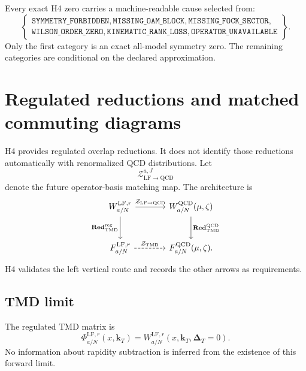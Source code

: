\documentclass[11pt]{article}
\newcommand{\kT}{\bm{k}_{T}}
\newcommand{\DT}{\bm{\Delta}_{T}}
\newcommand{\LF}{\ensuremath{\mathrm{LF}}}
\newcommand{\TMD}{\ensuremath{\mathrm{TMD}}}
\newcommand{\QCD}{\ensuremath{\mathrm{QCD}}}
\newcommand{\cZ}{\mathcal Z}
\newcommand{\reg}{\mathrm{reg}}
\newcommand{\Red}{\mathbf{Red}}
\begin{document}
Every exact H4 zero carries a machine-readable cause selected from:
\begin{equation}
 \left\{
 \begin{array}{l}
 \texttt{SYMMETRY\_FORBIDDEN},
 \texttt{MISSING\_OAM\_BLOCK},
 \texttt{MISSING\_FOCK\_SECTOR},\\
 \texttt{WILSON\_ORDER\_ZERO},
 \texttt{KINEMATIC\_RANK\_LOSS},
 \texttt{OPERATOR\_UNAVAILABLE}
 \end{array}
 \right\}.
 \label{eq:zero-ledger}
\end{equation}
Only the first category is an exact all-model symmetry zero.  The remaining
categories are conditional on the declared approximation.

\section{Regulated reductions and matched commuting diagrams}
\label{sec:reductions}

H4 provides regulated overlap reductions.  It does not identify those
reductions automatically with renormalized QCD distributions.  Let
\begin{equation}
 \cZ_{\LF\to\QCD}^{a,J}
 \label{eq:h4-matching-placeholder}
\end{equation}
denote the future operator-basis matching map.  The architecture is
\begin{equation}
 \begin{tikzcd}[column sep=large,row sep=large]
 W_{a/N}^{\LF,r}
   \arrow[r,"\cZ_{\LF\to\QCD}"]
   \arrow[d,"\Red_{\TMD}^{\reg}"']
 &W_{a/N}^{\QCD}(\mu,\zeta)
   \arrow[d,"\Red_{\TMD}^{\QCD}"]\\
 F_{a/N}^{\LF,r}
   \arrow[r,dashed,"\cZ_{\TMD}"]
 &F_{a/N}^{\QCD}(\mu,\zeta).
 \end{tikzcd}
 \label{eq:matching-reduction-square}
\end{equation}
H4 validates the left vertical route and records the other arrows as
requirements.

\subsection{TMD limit}

The regulated TMD matrix is
\begin{equation}
 \Phi_{a/N}^{\LF,r}(x,\kT)
 =W_{a/N}^{\LF,r}(x,\kT,\DT=0).
 \label{eq:h4-tmd-limit}
\end{equation}
No information about rapidity subtraction is inferred from the existence of
this forward limit.
\end{document}
